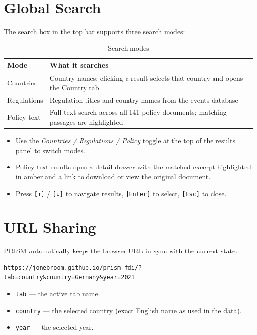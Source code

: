 \documentclass[12pt,a4paper]{article}
\newcommand{\keycap}[1]{%
  \texttt{\footnotesize[#1]}%
}
\newcommand{\uielem}[1]{\textit{#1}}
\begin{document}
\section{Global Search}
\label{sec:search}

The search box in the top bar supports three search modes:

\begin{table}[h]
\centering
\begin{tabularx}{\linewidth}{lX}
\toprule
\textbf{Mode} & \textbf{What it searches} \\
\midrule
Countries & Country names; clicking a result selects that country and opens the Country tab \\
Regulations & Regulation titles and country names from the events database \\
Policy text & Full-text search across all 141 policy documents; matching passages are highlighted \\
\bottomrule
\end{tabularx}
\caption{Search modes}
\end{table}

\begin{itemize}
  \item Use the \uielem{Countries / Regulations / Policy} toggle at the top of the results panel to switch modes.
  \item Policy text results open a detail drawer with the matched excerpt highlighted in amber and a link to download or view the original document.
  \item Press \keycap{↑}/\keycap{↓} to navigate results, \keycap{Enter} to select, \keycap{Esc} to close.
\end{itemize}

\section{URL Sharing}
\label{sec:url}

PRISM automatically keeps the browser URL in sync with the current state:

\begin{verbatim}
https://jonebroom.github.io/prism-fdi/?tab=country&country=Germany&year=2021
\end{verbatim}

\begin{itemize}
  \item \texttt{tab} — the active tab name.
  \item \texttt{country} — the selected country (exact English name as used in the data).
  \item \texttt{year} — the selected year.
\end{itemize}
\end{document}

